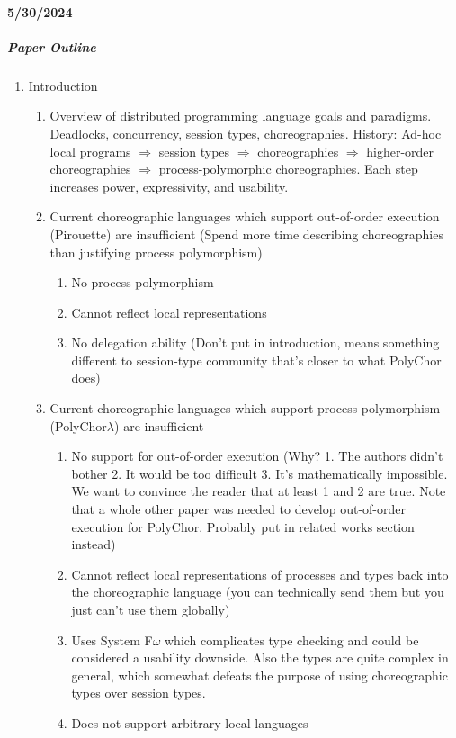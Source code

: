 \documentclass{article}
\theoremstyle{definition}
\begin{document}
\paragraph{5/30/2024}
\subparagraph{Paper Outline}
\begin{enumerate}
	\item Introduction
	\begin{enumerate}
		\item Overview of distributed programming language goals and paradigms. Deadlocks, concurrency, session types, choreographies. History: Ad-hoc local programs $\Rightarrow$ session types $\Rightarrow$ choreographies $\Rightarrow$ higher-order choreographies $\Rightarrow$ process-polymorphic choreographies. Each step increases power, expressivity, and usability.
		\item Current choreographic languages which support out-of-order execution (Pirouette) are insufficient
		(Spend more time describing choreographies than justifying process polymorphism)
		\begin{enumerate}
			\item No process polymorphism
			\item Cannot reflect local representations
			\item No delegation ability (Don't put in introduction, means something different to session-type community that's closer to what PolyChor does)
		\end{enumerate}
		\item Current choreographic languages which support process polymorphism (PolyChor$\lambda$) are insufficient
			\begin{enumerate}
				\item No support for out-of-order execution (Why? 1. The authors didn't bother 2. It would be too difficult 3. It's mathematically impossible. We want to convince the reader that at least 1 and 2 are true. Note that a whole other paper was needed to develop out-of-order execution for PolyChor. Probably put in related works section instead)
				\item Cannot reflect local representations of processes and types back into the choreographic language (you can technically send them but you just can't use them globally)
				\item Uses System F$\omega$ which complicates type checking and could be considered a usability downside. Also the types are quite complex in general, which somewhat defeats the purpose of using choreographic types over session types.
				\item Does not support arbitrary local languages

\end{enumerate}
\end{enumerate}
\end{enumerate}
\end{document}
